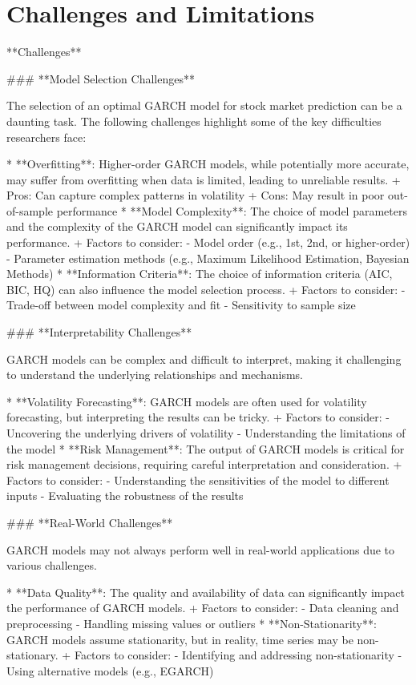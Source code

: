 \documentclass[conference]{IEEEtran}
\begin{document}
\section{Challenges and Limitations}
**Challenges**

\#\#\# **Model Selection Challenges**

The selection of an optimal GARCH model for stock market prediction can be a daunting task. The following challenges highlight some of the key difficulties researchers face:

* **Overfitting**: Higher-order GARCH models, while potentially more accurate, may suffer from overfitting when data is limited, leading to unreliable results.
	+ Pros: Can capture complex patterns in volatility
	+ Cons: May result in poor out-of-sample performance
* **Model Complexity**: The choice of model parameters and the complexity of the GARCH model can significantly impact its performance.
	+ Factors to consider:
		- Model order (e.g., 1st, 2nd, or higher-order)
		- Parameter estimation methods (e.g., Maximum Likelihood Estimation, Bayesian Methods)
* **Information Criteria**: The choice of information criteria (AIC, BIC, HQ) can also influence the model selection process.
	+ Factors to consider:
		- Trade-off between model complexity and fit
		- Sensitivity to sample size

\#\#\# **Interpretability Challenges**

GARCH models can be complex and difficult to interpret, making it challenging to understand the underlying relationships and mechanisms.

* **Volatility Forecasting**: GARCH models are often used for volatility forecasting, but interpreting the results can be tricky.
	+ Factors to consider:
		- Uncovering the underlying drivers of volatility
		- Understanding the limitations of the model
* **Risk Management**: The output of GARCH models is critical for risk management decisions, requiring careful interpretation and consideration.
	+ Factors to consider:
		- Understanding the sensitivities of the model to different inputs
		- Evaluating the robustness of the results

\#\#\# **Real-World Challenges**

GARCH models may not always perform well in real-world applications due to various challenges.

* **Data Quality**: The quality and availability of data can significantly impact the performance of GARCH models.
	+ Factors to consider:
		- Data cleaning and preprocessing
		- Handling missing values or outliers
* **Non-Stationarity**: GARCH models assume stationarity, but in reality, time series may be non-stationary.
	+ Factors to consider:
		- Identifying and addressing non-stationarity
		- Using alternative models (e.g., EGARCH)
\end{document}
